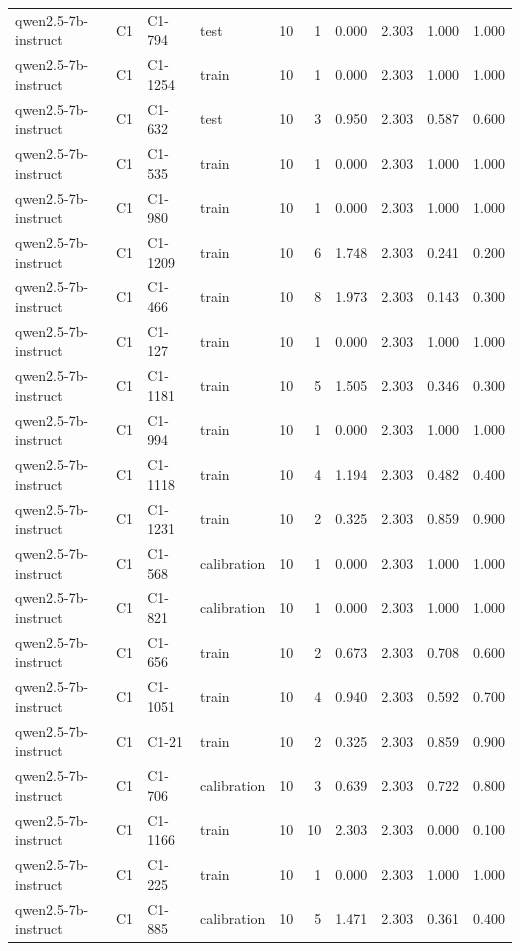 \begin{table}
\begin{tabular}{llllrrrrrr}
qwen2.5-7b-instruct & C1 & C1-794 & test & 10 & 1 & 0.000 & 2.303 & 1.000 & 1.000 \\
qwen2.5-7b-instruct & C1 & C1-1254 & train & 10 & 1 & 0.000 & 2.303 & 1.000 & 1.000 \\
qwen2.5-7b-instruct & C1 & C1-632 & test & 10 & 3 & 0.950 & 2.303 & 0.587 & 0.600 \\
qwen2.5-7b-instruct & C1 & C1-535 & train & 10 & 1 & 0.000 & 2.303 & 1.000 & 1.000 \\
qwen2.5-7b-instruct & C1 & C1-980 & train & 10 & 1 & 0.000 & 2.303 & 1.000 & 1.000 \\
qwen2.5-7b-instruct & C1 & C1-1209 & train & 10 & 6 & 1.748 & 2.303 & 0.241 & 0.200 \\
qwen2.5-7b-instruct & C1 & C1-466 & train & 10 & 8 & 1.973 & 2.303 & 0.143 & 0.300 \\
qwen2.5-7b-instruct & C1 & C1-127 & train & 10 & 1 & 0.000 & 2.303 & 1.000 & 1.000 \\
qwen2.5-7b-instruct & C1 & C1-1181 & train & 10 & 5 & 1.505 & 2.303 & 0.346 & 0.300 \\
qwen2.5-7b-instruct & C1 & C1-994 & train & 10 & 1 & 0.000 & 2.303 & 1.000 & 1.000 \\
qwen2.5-7b-instruct & C1 & C1-1118 & train & 10 & 4 & 1.194 & 2.303 & 0.482 & 0.400 \\
qwen2.5-7b-instruct & C1 & C1-1231 & train & 10 & 2 & 0.325 & 2.303 & 0.859 & 0.900 \\
qwen2.5-7b-instruct & C1 & C1-568 & calibration & 10 & 1 & 0.000 & 2.303 & 1.000 & 1.000 \\
qwen2.5-7b-instruct & C1 & C1-821 & calibration & 10 & 1 & 0.000 & 2.303 & 1.000 & 1.000 \\
qwen2.5-7b-instruct & C1 & C1-656 & train & 10 & 2 & 0.673 & 2.303 & 0.708 & 0.600 \\
qwen2.5-7b-instruct & C1 & C1-1051 & train & 10 & 4 & 0.940 & 2.303 & 0.592 & 0.700 \\
qwen2.5-7b-instruct & C1 & C1-21 & train & 10 & 2 & 0.325 & 2.303 & 0.859 & 0.900 \\
qwen2.5-7b-instruct & C1 & C1-706 & calibration & 10 & 3 & 0.639 & 2.303 & 0.722 & 0.800 \\
qwen2.5-7b-instruct & C1 & C1-1166 & train & 10 & 10 & 2.303 & 2.303 & 0.000 & 0.100 \\
qwen2.5-7b-instruct & C1 & C1-225 & train & 10 & 1 & 0.000 & 2.303 & 1.000 & 1.000 \\
qwen2.5-7b-instruct & C1 & C1-885 & calibration & 10 & 5 & 1.471 & 2.303 & 0.361 & 0.400 \\

\end{tabular}
\end{table}
